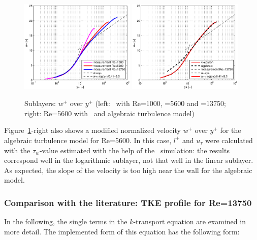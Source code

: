 \begin{figure}[!htb]
\centering
\includegraphics[trim=35 0 30 0,clip,width=0.49\textwidth]{FIGURES/wplusyplus.eps}
\includegraphics[trim=35 0 30 0,clip,width=0.49\textwidth]{FIGURES/avske.eps}
\caption{Sublayers: $w^+$ over $y^+$ (left: \ke\, with Re=1000, =5600 and =13750; right: Re=5600 with \ke\, and algebraic turbulence model)}
\label{fig:sublayers_y+}
\end{figure} 

\noindent Figure~\ref{fig:sublayers_y+}-right also shows a modified normalized velocity $w^+$ over $y^+$ for the algebraic turbulence model for Re=5600. In this case, $l^+$ and $u_{\tau}$ were calculated with the $\tau_w$-value estimated with the help of the \ke\, simulation: the results correspond well in the logarithmic sublayer, not that well in the linear sublayer. As expected, the slope of the velocity is too high near the wall for the algebraic model.

\newpage
\subsubsection*{Comparison with the literature: TKE profile for Re=13750}

In the following, the single terms in the $k$-transport equation are examined in more detail. The implemented form of this equation has the following form:

